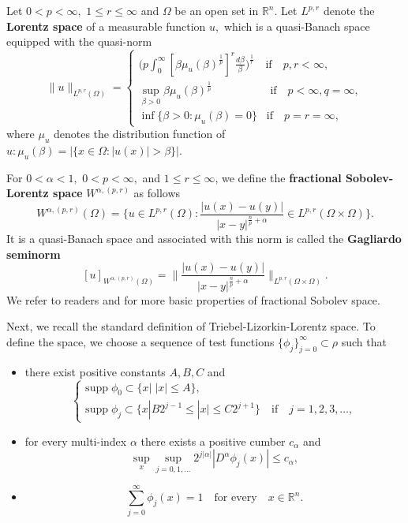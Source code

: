 \documentclass[12pt]{amsart}
\newcommand{\R}{\mathbb{R}}
\numberwithin{equation}{section}
\theoremstyle{plain}
\theoremstyle{definition}
\theoremstyle{remark}
\begin{document}
Let $0<p<\infty,$ $1\leq r\leq\infty$ and $\Omega$ be an open set in $\R^{n}$. Let $L^{p,r}$ denote the \textbf{Lorentz space} of a measurable function $u,$ which is a quasi-Banach space equipped with the quasi-norm
\[
\|u\|_{L^{p,r}(\Omega)}=
\begin{cases}
\Big( p\int_{0}^{\infty}[\beta \mu_{u}(\beta)^{\frac{1}{p}}]^{r}\frac{d\beta}{\beta}\Big)^{\frac{1}{r}}\quad\text{if}\quad p,r<\infty,\\
\sup\limits_{\beta>0}\beta \mu_{u}(\beta)^{\frac{1}{p}}\quad\quad\quad\quad\quad\;\text{if}\quad p<\infty, q=\infty,\\
\inf\{\beta>0:\mu_{u}(\beta)=0\} \;\;\;\text{if}\quad p=r=\infty,
\end{cases}
\]
where $\mu_{u}$ denotes the distribution function of $u:\mu_{u}(\beta)=|\{x\in\Omega:|u(x)|>\beta\}|.$

For $0<\alpha<1,$ $0<p<\infty,$ and $1\leq r\leq\infty$,  we define the \textbf{fractional Sobolev-Lorentz space} $W^{\alpha,(p,r)}$ as follows
\[
W^{\alpha,(p,r)}(\Omega)=\{u\in L^{p,r}(\Omega): \frac{|u(x)-u(y)|}{|x-y|^{\frac{n}{p}+\alpha}} \in L^{p,r}(\Omega\times\Omega)\}.
\]
 It is a quasi-Banach space and associated with this norm is called the \textbf{Gagliardo seminorm} 
 \[
 [u]_{W^{\alpha,(p,r)}(\Omega)}=\Big\| \frac{|u(x)-u(y)|}{|x-y|^{\frac{n}{p}+\alpha }} \Big\|_{L^{p,r}(\Omega\times\Omega)}.
 \]
 We refer to readers \cite{EE} and \cite{Le} for more basic properties of fractional Sobolev space.

Next, we recall the standard definition of Triebel-Lizorkin-Lorentz space. To define the space, we choose a sequence of test functions $\{\phi_{j}\}_{j=0}^{\infty}\subset \rho$ such that
 \begin{itemize}
 \item[(i)] there exist positive constants $A,B,C$ and
 \[
 \begin{cases}
\mathrm{supp}\; \phi_{0}\subset\{x| \; |x|\leq A\},\\
\mathrm{supp}\; \phi_{j}\subset\{x|  B 2^{j-1}\leq |x| \leq C 2^{j+1}\}\quad\text{if}\quad j=1,2,3,\dots,
 \end{cases}
 \]
 \item[(ii)] for every multi-index $\alpha$ there exists a positive cumber $c_{\alpha}$ and
 \[
 \sup_{x}\sup_{j=0,1,\dots} 2^{j|\alpha|}|D^{\alpha}\phi_{j}(x)|\leq c_{\alpha},
 \]
 \item[(iii)] \[
 \sum_{j=0}^{\infty}\phi_{j}(x)=1\quad\text{for every}\quad x\in\R^{n}.
 \]
 \end{itemize}
 
\end{document}
